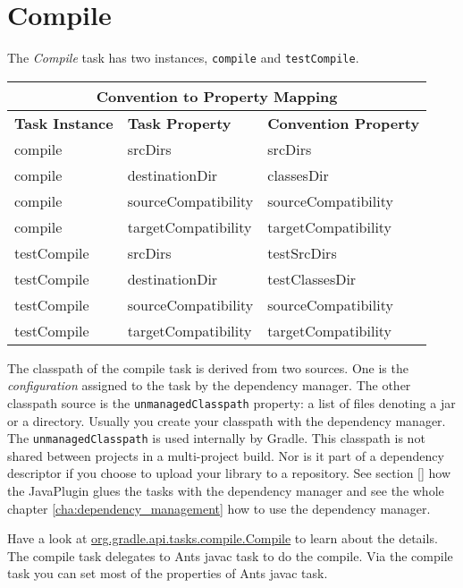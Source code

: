 \section{Compile} %
\label{sec:compile}
The \emph{Compile} task has two instances, \texttt{compile} and \texttt{testCompile}. 
\begin{center}
	\begin{tabular}{|l|l|l|} \hline
		\multicolumn{3}{|c|}{Convention to Property Mapping} \\ \hline
		\textbf{Task Instance} & \textbf{Task Property} & \textbf{Convention Property} \\ \hline
		compile & srcDirs & srcDirs \\ \hline
		compile & destinationDir & classesDir \\ \hline
		compile & sourceCompatibility & sourceCompatibility \\ \hline
		compile & targetCompatibility & targetCompatibility \\ \hline
		testCompile & srcDirs & testSrcDirs \\ \hline
		testCompile & destinationDir & testClassesDir \\ \hline
		testCompile & sourceCompatibility & sourceCompatibility \\ \hline
		testCompile & targetCompatibility & targetCompatibility \\ \hline
	\end{tabular} 
\end{center}
\noindent The classpath of the compile task is derived from two sources. One is the \emph{configuration} assigned to the task by the dependency manager. The other classpath source is the \texttt{unmanagedClasspath} property: a list of files denoting a jar or a directory. Usually you create your classpath with the dependency manager. The \texttt{unmanagedClasspath} is used internally by Gradle. This classpath is not shared between projects in a multi-project build. Nor is it part of a dependency descriptor if you choose to upload your library to a repository. 
See section \ref{} how the JavaPlugin glues the tasks with the dependency manager and see the whole chapter \ref{cha:dependency_management} how to use the dependency manager.

Have a look at \href{\API tasks/compile/Compile.html}{org.gradle.api.tasks.compile.Compile} to learn about the details. The compile task delegates to Ants javac task to do the compile. Via the compile task you can set most of the properties of Ants javac task. 

